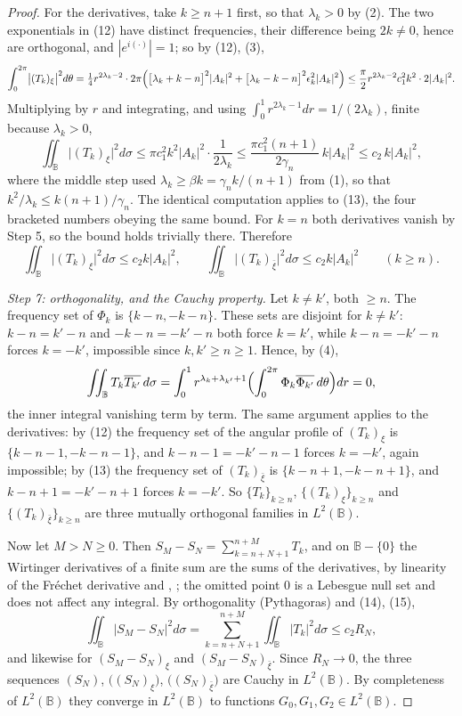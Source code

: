 \begin{proof}
For the derivatives, take $k\ge n+1$ first, so that $\lambda_k>0$ by (2).  The
two exponentials in (12) have distinct frequencies, their difference being
$2k\neq0$, hence are orthogonal, and $|e^{i(\cdot)}|=1$; so by (12), (3),
\[
  \int_0^{2\pi}\bigl|(T_k)_\xi\bigr|^2d\theta
  =\tfrac14r^{2\lambda_k-2}\cdot2\pi\Bigl(
    \bigl[\lambda_k+k-n\bigr]^2|A_k|^2
    +\bigl[\lambda_k-k-n\bigr]^2\epsilon_k^2|A_k|^2\Bigr)
  \le\frac{\pi}{2}r^{2\lambda_k-2}c_1^2k^2\cdot2|A_k|^2 .
\]
Multiplying by $r$ and integrating, and using
$\int_0^1r^{2\lambda_k-1}dr=1/(2\lambda_k)$, finite because $\lambda_k>0$,
\[
  \iint_{\mathbb{B}}\bigl|(T_k)_\xi\bigr|^2d\sigma
  \le\pi c_1^2k^2|A_k|^2\cdot\frac{1}{2\lambda_k}
  \le\frac{\pi c_1^2(n+1)}{2\gamma_n}\,k|A_k|^2\le c_2\,k|A_k|^2,
\]
where the middle step used $\lambda_k\ge\beta k=\gamma_nk/(n+1)$ from (1), so
that $k^2/\lambda_k\le k(n+1)/\gamma_n$.  The identical computation applies to
(13), the four bracketed numbers obeying the same bound.  For $k=n$ both
derivatives vanish by Step 5, so the bound holds trivially there.  Therefore
\begin{equation}\tag{15}
  \iint_{\mathbb{B}}\bigl|(T_k)_\xi\bigr|^2d\sigma\le c_2k|A_k|^2,\qquad
  \iint_{\mathbb{B}}\bigl|(T_k)_{\bar\xi}\bigr|^2d\sigma\le c_2k|A_k|^2
  \qquad(k\ge n).
\end{equation}

\emph{Step 7: orthogonality, and the Cauchy property.}  Let $k\neq k'$, both
$\ge n$.  The frequency set of $\Phi_k$ is $\{k-n,-k-n\}$.  These sets are
disjoint for $k\neq k'$: $k-n=k'-n$ and $-k-n=-k'-n$ both force $k=k'$, while
$k-n=-k'-n$ forces $k=-k'$, impossible since $k,k'\ge n\ge1$.  Hence, by (4),
\[
  \iint_{\mathbb{B}}T_k\overline{T_{k'}}\,d\sigma
  =\int_0^1r^{\lambda_k+\lambda_{k'}+1}
    \Bigl(\int_0^{2\pi}\Phi_k\overline{\Phi_{k'}}\,d\theta\Bigr)dr=0,
\]
the inner integral vanishing term by term.  The same argument applies to the
derivatives: by (12) the frequency set of the angular profile of
$(T_k)_\xi$ is $\{k-n-1,-k-n-1\}$, and $k-n-1=-k'-n-1$ forces $k=-k'$, again
impossible; by (13) the frequency set of $(T_k)_{\bar\xi}$ is
$\{k-n+1,-k-n+1\}$, and $k-n+1=-k'-n+1$ forces $k=-k'$.  So
$\{T_k\}_{k\ge n}$, $\{(T_k)_\xi\}_{k\ge n}$ and $\{(T_k)_{\bar\xi}\}_{k\ge n}$
are three mutually orthogonal families in $L^2(\mathbb{B})$.

Now let $M>N\ge0$.  Then $S_M-S_N=\sum_{k=n+N+1}^{n+M}T_k$, and on
$\mathbb{B}-\{0\}$ the Wirtinger derivatives of a finite sum are the sums of
the derivatives, by linearity of the Fréchet derivative and ,
; the omitted point $0$ is a Lebesgue null set and does not
affect any integral.  By orthogonality (Pythagoras) and (14), (15),
\[
  \iint_{\mathbb{B}}|S_M-S_N|^2d\sigma=\sum_{k=n+N+1}^{n+M}
    \iint_{\mathbb{B}}|T_k|^2d\sigma\le c_2R_N,
\]
and likewise for $(S_M-S_N)_\xi$ and $(S_M-S_N)_{\bar\xi}$.  Since $R_N\to0$,
the three sequences $(S_N)$, $\bigl((S_N)_\xi\bigr)$,
$\bigl((S_N)_{\bar\xi}\bigr)$ are Cauchy in $L^2(\mathbb{B})$.  By
completeness of $L^2(\mathbb{B})$ they converge in $L^2(\mathbb{B})$ to
functions $G_0,G_1,G_2\in L^2(\mathbb{B})$.


\end{proof}
